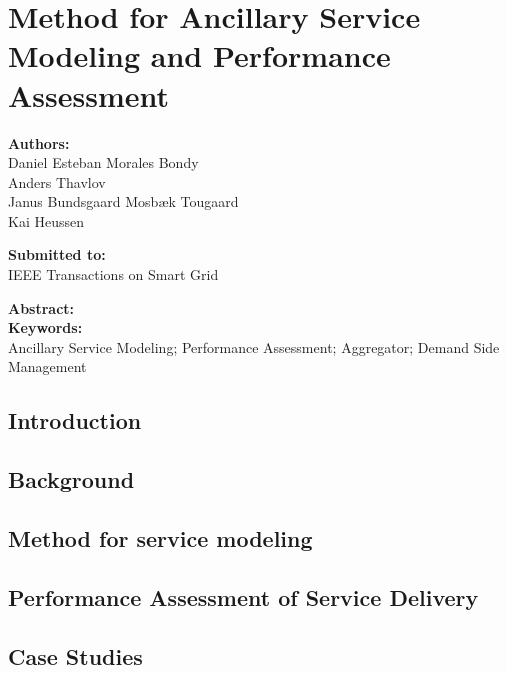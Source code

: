 \chapter{Method for Ancillary Service Modeling and Performance Assessment}
\label{app:tsg}

\textbf{Authors:}\\
Daniel Esteban Morales Bondy\\
Anders Thavlov\\
Janus Bundsgaard Mosb{\ae}k Tougaard\\
Kai Heussen

\noindent
\textbf{Submitted to:}\\
IEEE Transactions on Smart Grid

\noindent
\textbf{Abstract:}\\


\noindent
\textbf{Keywords:}\\
Ancillary Service Modeling; Performance Assessment; Aggregator; Demand Side Management

\section{Introduction}


\section{Background}\label{sec:TSGbackground}


\section{Method for service modeling}\label{sec:TSGmethodology}


\section{Performance Assessment of Service Delivery}\label{sec:TSGperformance}


\section{Case Studies}\label{sec:TSGcasestudies}


